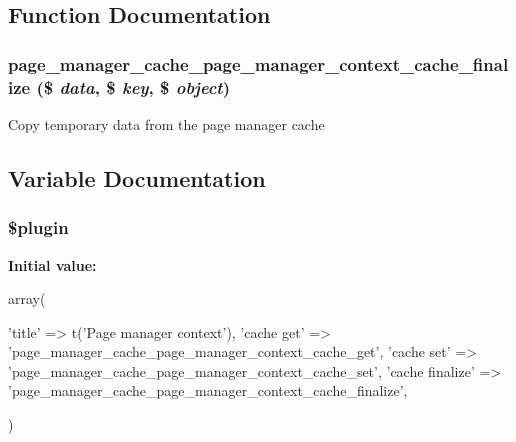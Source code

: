 \subsection{Function Documentation}
\hypertarget{page__manager__context_8inc_a6ab0606534bbea671ad4dbe5a103d36d}{
\subsubsection[{page\_\-manager\_\-cache\_\-page\_\-manager\_\-context\_\-cache\_\-finalize}]{\setlength{\rightskip}{0pt plus 5cm}page\_\-manager\_\-cache\_\-page\_\-manager\_\-context\_\-cache\_\-finalize (\$ {\em data}, \/  \$ {\em key}, \/  \$ {\em object})}}
\label{page__manager__context_8inc_a6ab0606534bbea671ad4dbe5a103d36d}
Copy temporary data from the page manager cache 

\subsection{Variable Documentation}
\hypertarget{page__manager__context_8inc_ada8a7130088351710bb02ed622d6bf65}{
\subsubsection[{\$plugin}]{\setlength{\rightskip}{0pt plus 5cm}\$plugin}}
\label{page__manager__context_8inc_ada8a7130088351710bb02ed622d6bf65}
{\bfseries Initial value:}
\begin{DoxyCode}
 array(
  
  
  'title' => t('Page manager context'),
  'cache get' => 'page_manager_cache_page_manager_context_cache_get',
  'cache set' => 'page_manager_cache_page_manager_context_cache_set',
  'cache finalize' => 'page_manager_cache_page_manager_context_cache_finalize',

  
  
)
\end{DoxyCode}

